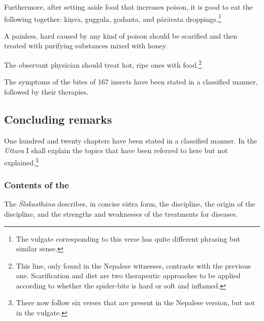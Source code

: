 \begin{translation}
\item[137]

Furthermore, after setting aside food that increases poison,
it is good to eat the following together:
\gls{kiṇva},
\gls{guggula},
\gls{godanta}, and
\gls{pārāvata} droppings.\footnote{The vulgate corresponding to this verse 
has quite different phrasing but similar sense.}

\item[138]

A painless, hard  caused by any kind of poison should be 
scarified and then treated with purifying substances mixed with honey.

\item[138 add]
 
The observant physician should treat hot, ripe ones with food.\footnote{This 
line, only found in the Nepalese witnesses, contrasts with the previous one.  
Scarification and diet are two therapeutic approaches to be applied according to 
whether the spider-bite is hard or soft and inflamed.}
    
\item[139]

The symptoms of the bites of 167 insects have been stated
in a classified manner, followed by their therapies.

\subsection{Concluding remarks}

\item[140]

One hundred and twenty chapters have been stated in a classified manner. In 
the \emph{Uttara} I shall explain the topics that have been referred to here but 
not explained.\footnote{There now follow six verses that are present in the 
Nepalese version, but not in the vulgate.}

\subsubsection{Contents of the \SS}

\item[140 add 1]

The \emph{Ślokasthāna} describes, in concise sūtra form, the
discipline, the origin of the discipline, and the strengths and
weaknesses of the treatments for diseases.

\item[140 add 2]


\end{translation}

